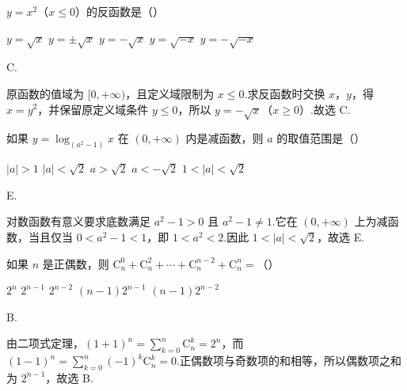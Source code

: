 \begin{problem}

\(y = x^{2}\)（\(x \leqslant 0\)）的反函数是（\quad）

\choicesfive
    {\(y=\sqrt{x} \)}
    {\(y=\pm\sqrt{x} \)}
    {\(y=-\sqrt{x} \)}
    {\(y = \sqrt{-x} \)}
    {\(y = -\sqrt{-x} \)}
\end{problem}

\begin{answer}
C.
\end{answer}

\begin{solution}
原函数的值域为 \([0,+\infty)\)，且定义域限制为 \(x\leqslant0\).求反函数时交换 \(x\)，\(y\)，得 \(x=y^{2}\)，并保留原定义域条件 \(y\leqslant0\)，所以 \(y=-\sqrt{x}\)（\(x\geqslant0\)）.故选 C.
\end{solution}

\begin{problem}

如果 \(y = \log_{(a^2 - 1)} x \) 在 \((0, +\infty) \) 内是减函数，则 \(a \) 的取值范围是（\quad）

\choicesfive
    {\(|a| > 1 \)}
    {\(|a| < \sqrt{2} \)}
    {\(a > \sqrt{2} \)}
    {\(a < -\sqrt{2} \)}
    {\(1 < |a| < \sqrt{2} \)}
\end{problem}

\begin{answer}
E.
\end{answer}

\begin{solution}
对数函数有意义要求底数满足 \(a^{2}-1>0\) 且 \(a^{2}-1\ne1\).它在 \((0,+\infty)\) 上为减函数，当且仅当 \(0<a^{2}-1<1\)，即 \(1<a^{2}<2\).因此 \(1<|a|<\sqrt2\)，故选 E.
\end{solution}

\begin{problem}

如果 \(n\) 是正偶数，则 \(\mathrm C_{n}^{0} + \mathrm C_{n}^{2} + \cdots + \mathrm C_{n}^{n-2} + \mathrm C_{n}^{n} = \)（\quad）

\choicesfive
    {\(2^{n} \)}
    {\(2^{n-1} \)}
    {\(2^{n-2} \)}
    {\((n-1)2^{n-1} \)}
    {\((n-1)2^{n-2} \)}
\end{problem}

\begin{answer}
B.
\end{answer}

\begin{solution}
由二项式定理，\((1+1)^{n}=\sum_{k=0}^{n}\mathrm C_n^k=2^n\)，而 \((1-1)^n=\sum_{k=0}^{n}(-1)^k\mathrm C_n^k=0\).正偶数项与奇数项的和相等，所以偶数项之和为 \(2^{n-1}\)，故选 B.
\end{solution}

